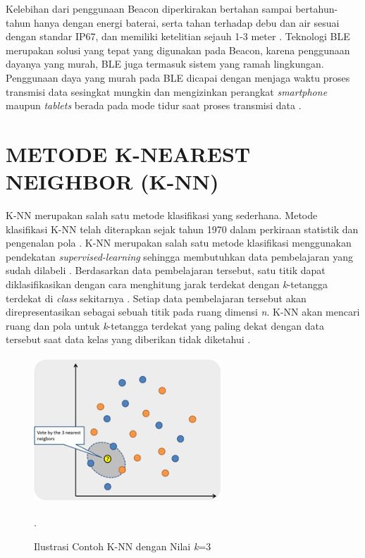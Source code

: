 \par Kelebihan dari penggunaan Beacon diperkirakan bertahan sampai bertahun-tahun hanya dengan energi baterai, serta tahan terhadap debu dan air sesuai dengan standar IP67, dan memiliki ketelitian sejauh 1-3 meter \citep{Insoft2016}. Teknologi BLE merupakan solusi yang tepat yang digunakan pada Beacon, karena penggunaan dayanya yang murah, BLE juga termasuk sistem yang ramah lingkungan. Penggunaan daya yang murah pada BLE dicapai dengan menjaga waktu proses transmisi data sesingkat mungkin dan mengizinkan perangkat \textit{smartphone} maupun \textit{tablets} berada pada mode tidur saat proses transmisi data \citep{Lindh2015}.

\section{\uppercase{Metode K-NEAREST NEIGHBOR (K-NN)}}
K-NN merupakan salah satu metode klasifikasi yang sederhana. Metode klasifikasi K-NN telah diterapkan sejak tahun 1970 dalam perkiraan statistik dan pengenalan pola \citep{Park2015}. K-NN merupakan salah satu metode klasifikasi menggunakan pendekatan \textit{supervised-learning} sehingga membutuhkan data pembelajaran yang sudah dilabeli \citep{LukitoAntonius2015}. Berdasarkan data pembelajaran tersebut, satu titik dapat diklasifikasikan dengan cara menghitung jarak terdekat dengan \textit{k}-tetangga terdekat di \textit{class} sekitarnya \citep{Kadyan2016}. Setiap data pembelajaran tersebut akan direpresentasikan sebagai sebuah titik pada ruang dimensi \textit{n}. K-NN akan mencari ruang dan pola untuk \textit{k}-tetangga terdekat yang paling dekat dengan data tersebut saat data kelas yang diberikan tidak diketahui \citep{Imandoust2013}.

\begin{figure}[H]
	\centering
	\includegraphics [width = 7cm, height= 5.5cm]{gambar/knn}
	\caption{Ilustrasi Contoh K-NN dengan Nilai \textit{k}=3 \citep{suryanto2016}}.
	\label{knn}
\end{figure}

